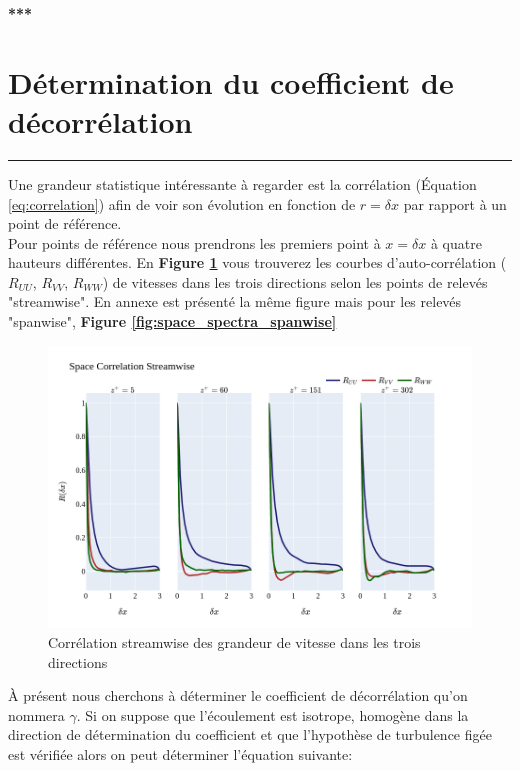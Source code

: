 \documentclass[12pt]{article}
\theoremstyle{plain}
\theoremstyle{remark}
\begin{document}
\begin{center}
	\large \bf{***}
\end{center}

\vspace{0.3cm}
\section{Détermination du coefficient de décorrélation}
\noindent\rule{\linewidth}{2pt}
\vspace{0.1cm}

Une grandeur statistique intéressante à regarder est la corrélation (Équation \ref{eq:correlation}) afin de voir son évolution en fonction de $r=\delta x$ par rapport à un point de référence.\\
Pour points de référence nous prendrons les premiers point à $x=\delta x$ à quatre hauteurs différentes. En {\bf Figure \ref{fig:space_spectra}} vous trouverez les courbes d'auto-corrélation ($R_{UU}$, $R_{VV}$, $R_{WW}$) de vitesses dans les trois directions selon les points de relevés "streamwise". En annexe est présenté la même figure mais pour les relevés "spanwise", {\bf Figure \ref{fig:space_spectra_spanwise}} \\


\begin{figure}[H]
	\begin{center}
		\includegraphics[width=0.8\linewidth]{../../output/figures/channel_wrles_retau395/split_time/space_correlation/streamwise.png}
		\caption{Corrélation streamwise des grandeur de vitesse dans les trois directions}
		\label{fig:space_spectra}
	\end{center}
\end{figure}

À présent nous cherchons à déterminer le coefficient de décorrélation qu'on nommera $\gamma$. Si on suppose que l'écoulement est isotrope, homogène dans la direction de détermination du coefficient et que l'hypothèse de turbulence figée est vérifiée alors on peut déterminer l'équation suivante: 
\end{document}

